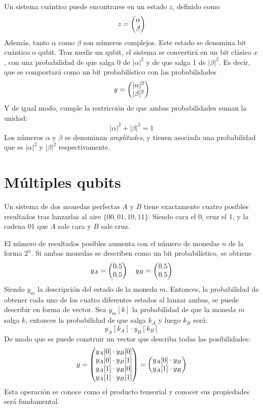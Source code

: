 Un sistema cuántico puede encontrarse en un estado $z$, definido como
%
$$ z = \begin{pmatrix} \alpha \\ \beta \end{pmatrix}$$
%
Además, tanto $\alpha$ como $\beta$ son números complejos. Este estado se 
denomina bit cuántico o qubit.
%
Tras medir un qubit, el sistema se convertirá en un bit clásico $x$, con una 
probabilidad de que salga 0 de $|\alpha|^2$ y de que salga 1 de $|\beta|^2$.
Es decir, que se comportará como un bit probabilístico con las probabilidades
%
$$ y = \begin{pmatrix} |\alpha|^2 \\ |\beta|^2 \end{pmatrix}$$
%
Y de igual modo, cumple la restricción de que ambas probabilidades suman la 
unidad:
%
$$ |\alpha|^2 + |\beta|^2 = 1 $$
%
Los números $\alpha$ y $\beta$ se denominan \textit{amplitudes}, y tienen 
asociada una probabilidad que es $|\alpha|^2$ y $|\beta|^2$ respectivamente.

\section{Múltiples qubits}
Un sistema de dos monedas perfectas $A$ y $B$ tiene exactamente cuatro posibles 
resultados tras lanzarlas al aire $\{00, 01, 10, 11\}$. Siendo cara el 0, cruz 
el 1, y la cadena 01 que $A$ sale cara y $B$ sale cruz.

El número de resultados posibles aumenta con el número de monedas $n$ de la 
forma $2^n$. Si ambas monedas se describen como un bit probabilístico, se 
obtiene
$$ y_A = \begin{pmatrix} 0.5 \\ 0.5 \end{pmatrix} \quad y_B = \begin{pmatrix} 0.5 \\ 0.5 \end{pmatrix} $$
Siendo $y_m$ la descripción del estado de la moneda $m$. Entonces, la 
probabilidad de obtener cada uno de los cuatro diferentes estados al lanzar 
ambas, se puede describir en forma de vector.
Sea $y_m[k]$ la probabilidad de que la moneda $m$ salga $k$, entonces la 
probabilidad de que salga $k_A$ y luego $k_B$ será:
$$ y_A[k_A] \cdot y_B[k_B] $$
De modo que se puede construir un vector que describa todas las posibilidades:
$$ y = \begin{pmatrix} 
	y_A[0] \cdot y_B[0] \\ y_A[0] \cdot y_B[1] \\
	y_A[1] \cdot y_B[0] \\ y_A[1] \cdot y_B[1]
 \end{pmatrix}
= \begin{pmatrix} 
	y_A[0] \cdot y_B \\
	y_A[1] \cdot y_B
 \end{pmatrix} $$
Esta operación se conoce como el producto tensorial y conocer sus propiedades
será fundamental.

